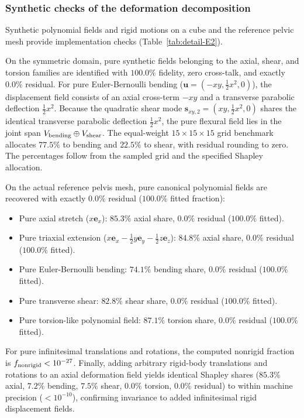 \documentclass[pdflatex,sn-basic]{sn-jnl}
\begin{document}
\subsubsection{Synthetic checks of the deformation decomposition}
Synthetic polynomial fields and rigid motions on a cube and the reference pelvic mesh provide implementation checks (Table~\ref{tab:detail-E2}).

On the symmetric domain, pure synthetic fields belonging to the axial, shear, and torsion families are identified with $100.0\%$ fidelity, zero cross-talk, and exactly $0.0\%$ residual.
For pure Euler-Bernoulli bending ($\mathbf u = (-xy, \tfrac{1}{2}x^2, 0)$), the displacement field consists of an axial cross-term $-xy$ and a transverse parabolic deflection $\tfrac{1}{2}x^2$.
Because the quadratic shear mode $\mathbf s_{xy,2} = (xy, \tfrac{1}{2}x^2, 0)$ shares the identical transverse parabolic deflection $\tfrac{1}{2}x^2$, the pure flexural field lies in the joint span $V_{\rm bending} \oplus V_{\rm shear}$.
The equal-weight $15\times15\times15$ grid benchmark allocates $77.5\%$ to bending and $22.5\%$ to shear, with residual rounding to zero. The percentages follow from the sampled grid and the specified Shapley allocation.

On the actual reference pelvis mesh, pure canonical polynomial fields are recovered with exactly $0.0\%$ residual ($100.0\%$ fitted fraction):
\begin{itemize}
\item Pure axial stretch ($x\mathbf e_x$): $85.3\%$ axial share, $0.0\%$ residual ($100.0\%$ fitted).
\item Pure triaxial extension ($x\mathbf e_x - \tfrac{1}{2}y\mathbf e_y - \tfrac{1}{2}z\mathbf e_z$): $84.8\%$ axial share, $0.0\%$ residual ($100.0\%$ fitted).
\item Pure Euler-Bernoulli bending: $74.1\%$ bending share, $0.0\%$ residual ($100.0\%$ fitted).
\item Pure transverse shear: $82.8\%$ shear share, $0.0\%$ residual ($100.0\%$ fitted).
\item Pure torsion-like polynomial field: $87.1\%$ torsion share, $0.0\%$ residual ($100.0\%$ fitted).
\end{itemize}
For pure infinitesimal translations and rotations, the computed nonrigid fraction is $f_{\rm nonrigid} < 10^{-27}$.
Finally, adding arbitrary rigid-body translations and rotations to an axial deformation field yields identical Shapley shares ($85.3\%$ axial, $7.2\%$ bending, $7.5\%$ shear, $0.0\%$ torsion, $0.0\%$ residual) to within machine precision ($< 10^{-10}$), confirming invariance to added infinitesimal rigid displacement fields.
\end{document}
